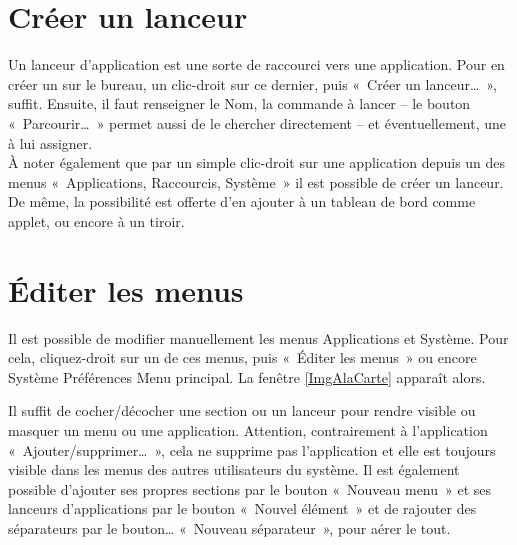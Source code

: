 \section{Créer un lanceur}
\label{RefLanceur}
Un lanceur d'application est une sorte de raccourci vers une application. Pour en créer un sur le bureau, un clic-droit sur ce dernier, puis «~Créer un lanceur\ldots{}~», suffit. Ensuite, il faut renseigner le Nom, la commande à lancer -- le bouton «~Parcourir\ldots{}~» permet aussi de le chercher directement -- et éventuellement, une  à lui assigner.\\
À noter également que par un simple clic-droit sur une application depuis un des menus «~Applications, Raccourcis, Système~» il est possible de créer un lanceur. De même, la possibilité est offerte d'en ajouter à un tableau de bord comme applet, ou encore à un tiroir.
\section{Éditer les menus}
\label{RefEditerMenus}
Il est possible de modifier manuellement les menus Applications et Système. Pour cela, cliquez-droit sur un de ces menus, puis «~Éditer les menus~» ou encore  Système \FlecheDroite Préférences \FlecheDroite Menu principal. La fenêtre \ref{ImgAlaCarte} apparaît alors.\par
{}
Il suffit de cocher/décocher une section ou un lanceur %
pour rendre visible ou masquer un menu ou une application. Attention, contrairement à l'application «~Ajouter/supprimer\dots{}~», cela ne supprime pas l'application et elle est toujours visible dans les menus des autres utilisateurs du système. Il est également possible d'ajouter ses propres sections par le bouton «~Nouveau menu~» et ses lanceurs d'applications par le bouton «~Nouvel élément~» et de rajouter des séparateurs par le bouton\ldots{} «~Nouveau séparateur~», pour aérer le tout.
